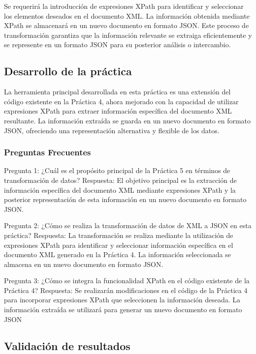 Se requerirá la introducción de expresiones XPath para identificar y seleccionar los elementos deseados en el documento XML. La información obtenida mediante XPath se almacenará en un nuevo documento en formato JSON. Este proceso de transformación garantiza que la información relevante se extraiga eficientemente y se represente en un formato JSON para su posterior análisis o intercambio.

\subsection{Desarrollo de la práctica}

\noindent La herramienta principal desarrollada en esta práctica es una extensión del código existente en la Práctica 4, ahora mejorado con la capacidad de utilizar expresiones XPath para extraer información específica del documento XML resultante. La información extraída se guarda en un nuevo documento en formato JSON, ofreciendo una representación alternativa y flexible de los datos.

\subsubsection{Preguntas Frecuentes}

\noindent Pregunta 1: ¿Cuál es el propósito principal de la Práctica 5 en términos de transformación de datos?
Respuesta: El objetivo principal es la extracción de información específica del documento XML mediante expresiones XPath y la posterior representación de esta información en un nuevo documento en formato JSON.

Pregunta 2: ¿Cómo se realiza la transformación de datos de XML a JSON en esta práctica?
Respuesta: La transformación se realiza mediante la utilización de expresiones XPath para identificar y seleccionar información específica en el documento XML generado en la Práctica 4. La información seleccionada se almacena en un nuevo documento en formato JSON.

Pregunta 3: ¿Cómo se integra la funcionalidad XPath en el código existente de la Práctica 4?
Respuesta: Se realizarán modificaciones en el código de la Práctica 4 para incorporar expresiones XPath que seleccionen la información deseada. La información extraída se utilizará para generar un nuevo documento en formato JSON

\subsection{Validación de resultados}

